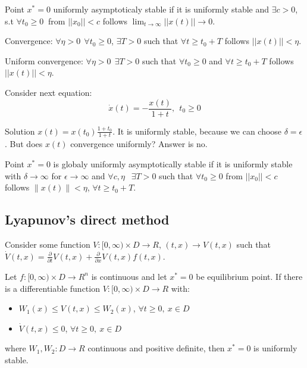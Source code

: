  Point $x^*=0$ uniformly asymptoticaly stable if it is uniformly stable and 
 $\exists c>0$, s.t $\forall t_0 \ge 0\ $ from $||x_0||<c$
 follows $\lim_{t\to \infty} ||x(t)|| \to 0$.


 Convergence: $\forall \eta > 0 \ \ \forall t_0 \ge 0$, $\exists T>0$ such
 that $\forall t \ge t_0+T$ follows $||x(t)||<\eta$.

 Uniform convergence: $\forall \eta > 0 \ \ \exists T>0$ such
 that $\forall t_0 \ge 0$ and $\forall t \ge t_0+T$ follows $||x(t)||<\eta$.


Consider next equation:
 \begin{equation}
   \dot x(t) = -\frac{x(t)}{1+t}, \ \ t_0\ge 0
 \end{equation}

 Solution $x(t)=x(t_0)\frac{1+t_0}{1+t}$. It is uniformly stable,
 because we can choose $\delta = \epsilon$. But does $x(t)$ convergence
 uniformly? Answer is no. 

 Point $x^*=0$ is globaly uniformly asymptotically stable if it is uniformly stable
 with $\delta \to \infty$ for $\epsilon \to \infty$ and $\forall c,\eta\ \ $ 
 $\exists T>0$ such that $\forall t_0\ge0$ from $||x_0||<c$ follows 
 $\|x(t)\|<\eta$, $\forall t \ge t_0 + T$.


\subsection{Lyapunov's direct method}

Consider some function $V:[0,\infty)\times D\to R$, $(t,x)\to V(t,x)$ such that
$\dot V(t,x)=\frac{\partial}{\partial t}V(t,x)+\frac{\partial}{\partial x}V(t,x) f(t,x)$.

 Let $f:[0,\infty)\times D\to R^n$ is continuous and let $x^*=0$ be equilibrium point.
 If there is a differentiable function $V:[0,\infty)\times D\to R$ with:
 \begin{itemize}
  \item $W_1(x) \le V(t,x) \le W_2(x)$, $\forall t\ge0,\ x\in D$
  \item $\dot V(t,x)\le 0$, $\forall t \ge0,\ x\in D$
 \end{itemize}
 where $W_1,W_2:D \to R$ continuous and positive definite, then $x^*=0$ is uniformly stable.

